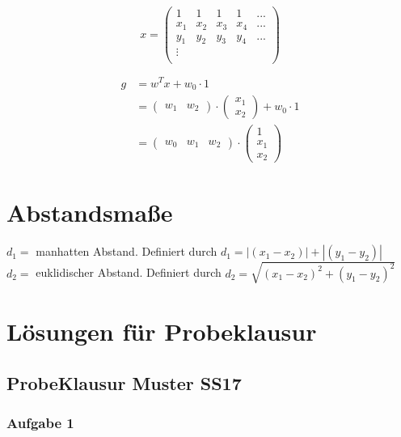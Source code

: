 \documentclass{article}
\begin{document}
$$x = \begin{pmatrix}
1 & 1 & 1 & 1 & ... \\
x_1 & x_2 & x_3 & x_4 & ...\\
y_1 & y_2 & y_3 & y_4 & ...\\
\vdots\\
\end{pmatrix}$$

\begin{equation}
\begin{aligned}
	g &= w^T x+ w_{0} \cdot 1
	\\
	&= \begin{pmatrix}
	w_1 & w_2
	\end{pmatrix}
	\cdot
	\begin{pmatrix}
	x_1\\
	x_2
	\end{pmatrix}
	+ w_0 \cdot 1
	\\
	&= \begin{pmatrix}
	w_0 & w_1 & w_2 
	\end{pmatrix}
		\cdot
	\begin{pmatrix}
	1\\
	x_1\\
	x_2
	\end{pmatrix}
\end{aligned}
\end{equation}

\section{Abstandsmaße}
$d_1 =$ manhatten Abstand. Definiert durch $d_1 = |(x_1 - x_2)| + |(y_1 - y_2)|$
\\
$d_2 =$ euklidischer Abstand. Definiert durch $d_2=\sqrt{(x_1 - x_2)^2+(y_1 - y_2)^2}$
\\


\newpage
\section{Lösungen für Probeklausur}

\subsection{ProbeKlausur Muster SS17}

\subsubsection{Aufgabe 1}
\end{document}
